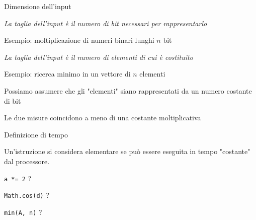 \begin{frame}[shrink=5]{Dimensione dell'input}

\vspace{-9pt}
\begin{myboxtitle}
\BI
\item \emph{La taglia dell'input è il numero di bit necessari per rappresentarlo}
\item Esempio: moltiplicazione di numeri binari lunghi $n$ bit
\EI
\end{myboxtitle}

\begin{myboxtitle}
\BI
\item \emph{La taglia dell'input è il numero di elementi di cui è costituito}
\item Esempio: ricerca minimo in un vettore di $n$ elementi
\EI
\end{myboxtitle}

\begin{myboxtitle}
\BI
\item Possiamo assumere che gli "elementi" siano rappresentati da un numero costante di bit
\item Le due misure coincidono a meno di una costante moltiplicativa
\EI
\end{myboxtitle}

\end{frame}

\begin{frame}{Definizione di tempo}

\vspace{-9pt}
\begin{myboxtitle}
Un'istruzione si considera elementare se può essere eseguita in tempo "costante"
dal processore.
\end{myboxtitle}

\begin{myboxtitle}
\BI
\item \texttt{a *= 2} ?
\item \texttt{Math.cos(d)} ?
\item \texttt{min(A, n)} ?
\EI
\end{myboxtitle}


\end{frame}



